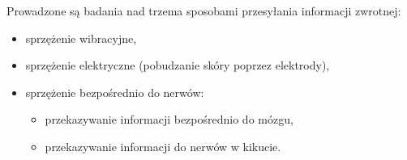\documentclass[8pt]{beamer}
\begin{document}
		
		\begin{frame}
			Prowadzone są badania nad trzema sposobami przesyłania informacji zwrotnej:
			\begin{itemize}[<+->]
				\item sprzężenie wibracyjne,
				\item sprzężenie elektryczne (pobudzanie skóry poprzez elektrody),
				\item sprzężenie bezpośrednio do nerwów:
				\begin{itemize}[<+->]
					\item przekazywanie informacji bezpośrednio do mózgu,
					\item przekazywanie informacji do nerwów w kikucie.
				\end{itemize}
			\end{itemize}
		\end{frame}
		
\end{document}
